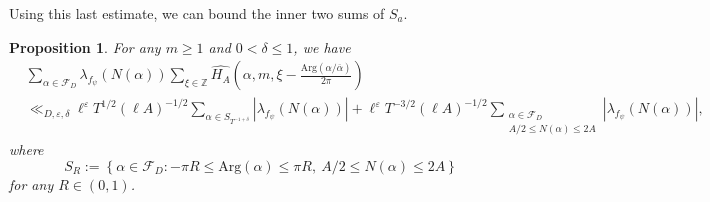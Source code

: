 \documentclass[11pt]{amsart}
\newcommand{\Z}{\mathbb{Z}}
\newtheorem{proposition}[theorem]{Proposition}
\theoremstyle{definition}
\theoremstyle{remark}
\begin{document}
Using this last estimate, we can bound the inner two sums of $S_a$.

\begin{proposition}\label{BoundInnerSumsSa}
For any $m\geq 1$ and $0 < \delta \leq 1$, we have 
\begin{align*}
    &\sum_{\alpha \in \mathcal{F}_{D}} \lambda_{f_{\psi}}(N(\alpha)) \sum_{\xi\in \Z} \widehat{H_A}\left( \alpha,m,\xi-\frac{\mathrm{Arg}(\alpha/\overline{\alpha})}{2\pi} \right) \\
    &\ll_{D,\varepsilon,\delta} \ell^{\varepsilon} T^{1/2} (\ell A)^{-1/2} \sum_{\alpha \in S_{T^{-1+\delta}}} |\lambda_{f_{\psi}}(N(\alpha))| + \ell^{\varepsilon} T^{-3/2} (\ell A)^{-1/2} \sum_{\substack{\alpha \in \mathcal{F}_{D} \\ A/2 \leq N(\alpha) \leq 2A}} |\lambda_{f_{\psi}}(N(\alpha))|,
\end{align*}
where $$ S_{R} := \left\{ \alpha \in \mathcal{F}_{D} : -\pi R \leq \mathrm{Arg}(\alpha) \leq \pi R, \: A/2 \leq N(\alpha) \leq 2A \right\}$$ for any $R\in (0,1)$.
\end{proposition}
\end{document}
